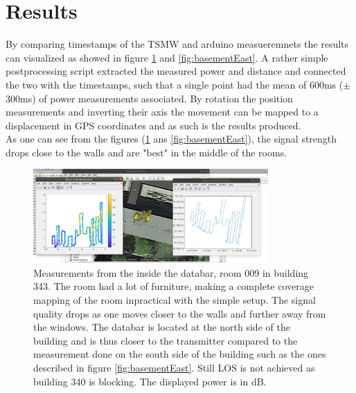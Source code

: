 \documentclass[a4paper,twoside, 12pt]{article}
\begin{document}
\section{Results}
By comparing timestamps of the TSMW and arduino measueremnets the results can visualized as showed in figure \ref{fig:databar} and \ref{fig:basementEast}. A rather simple postprocessing script extracted the measured power and distance and connected the two with the timestamps, such that a single point had the mean of 600ms ($\pm$ 300ms) of power measurements associated. By rotation the position measurements and inverting their axis the movement can be mapped to a displacement in GPS coordinates and as such is the results produced.\\
As one can see from the figures (\ref{fig:databar} ans \ref{fig:basementEast}), the signal strength drops close to the walls and are "best" in the middle of the rooms. 

\begin{figure}[ht]
\centering
\includegraphics[width=0.8\textwidth]{databar.png}
\caption{Measurements from the inside the databar, room 009 in building 343. The room had a lot of furniture, making a complete coverage mapping of the room inpractical with the simple setup. The signal quality drops as one moves closer to the walls and further away from the windows. The databar is located at the north side of the building and is thus closer to the transmitter compared to the measurement done on the south side of the building such as the ones described in figure \ref{fig:basementEast}. Still LOS is not achieved as building 340 is blocking. The displayed power is in dB.}
\label{fig:databar}
\end{figure}
\end{document}
